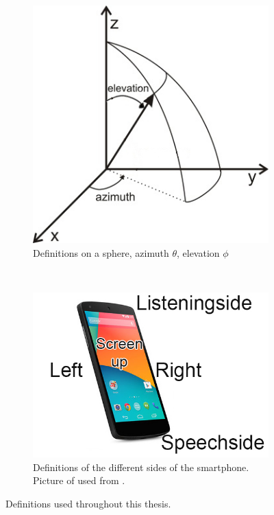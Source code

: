 \begin{figure}[h]
\centering
\begin{subfigure}[t]{0.45\textwidth}
    \centering
    \includegraphics[width=\textwidth]{afbeeldingen/azel.jpeg}
    \caption{Definitions on a sphere, azimuth $\theta$, elevation $\phi$}
    \label{fig:bol_def}
\end{subfigure}~
\begin{subfigure}[t]{0.45\textwidth}
    \centering
    \includegraphics[width=\textwidth]{afbeeldingen/nexus_sides.jpg}
    \caption{Definitions of the different sides of the smartphone. Picture of {\nexus} used from \cite{nexus:figure}.}
    \label{fig:def_nexus}
\end{subfigure}
\caption[Definitions in this thesis]{Definitions used throughout this thesis.}
\label{fig:def}
\end{figure}